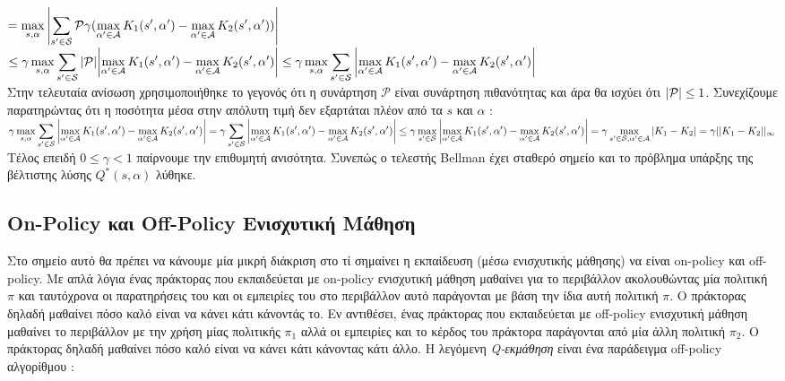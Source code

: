 \documentclass[11pt]{article} %
\numberwithin{equation}{subsection}
\begin{document}
$\displaystyle= \max_{s, \alpha} \abs{ \sum_{s' \in \mathcal{S}} \mathcal{P} \gamma (\max_{\alpha ' \in \mathcal{A}} K_1 (s', \alpha ') -\max_{\alpha ' \in \mathcal{A}} K_2 (s', \alpha ')) }$\\

$\displaystyle \leq \gamma \max_{s, \alpha}  \sum_{s' \in \mathcal{S}} \abs{ \mathcal{P}} \abs{\max_{\alpha ' \in \mathcal{A}} K_1 (s', \alpha ') -\max_{\alpha ' \in \mathcal{A}} K_2 (s', \alpha ')} \leq \gamma  \max_{s, \alpha}  \sum_{s' \in \mathcal{S}}\abs{\max_{\alpha ' \in \mathcal{A}} K_1 (s', \alpha ') -\max_{\alpha ' \in \mathcal{A}} K_2 (s', \alpha ')}  $\\

Στην τελευταία ανίσωση χρησιμοποιήθηκε το γεγονός ότι η συνάρτηση $\mathcal{P}$ είναι συνάρτηση πιθανότητας και άρα θα ισχύει ότι $\abs{\mathcal{P}} \leq 1$. Συνεχίζουμε παρατηρώντας ότι η ποσότητα μέσα στην απόλυτη τιμή δεν εξαρτάται πλέον από τα $s$ και $\alpha$ :\\

$\displaystyle \gamma  \max_{s, \alpha}  \sum_{s' \in \mathcal{S}}\abs{\max_{\alpha ' \in \mathcal{A}} K_1 (s', \alpha ') -\max_{\alpha ' \in \mathcal{A}} K_2 (s', \alpha ')} = \gamma \sum_{s' \in \mathcal{S}}\abs{\max_{\alpha ' \in \mathcal{A}} K_1 (s', \alpha ') -\max_{\alpha ' \in \mathcal{A}} K_2 (s', \alpha ')} \leq \gamma \max_{s' \in \mathcal{S}} \abs{\max_{\alpha ' \in \mathcal{A}} K_1 (s', \alpha ') -\max_{\alpha ' \in \mathcal{A}} K_2 (s', \alpha ')} = \gamma \max_{s' \in \mathcal{S}, \alpha ' \in \mathcal{A}} \abs{K_1 - K_2} = \gamma ||K_1 - K_2||_{\infty}$\\

Τέλος επειδή $0 \leq \gamma < 1$ παίρνουμε την επιθυμητή ανισότητα. Συνεπώς ο τελεστής Bellman έχει σταθερό σημείο και το πρόβλημα υπάρξης της βέλτιστης λύσης $Q^*(s,\alpha)$ λύθηκε. \\



\subsection{On-Policy και Off-Policy Ενισχυτική Μάθηση}

 Στο σημείο αυτό θα πρέπει να κάνουμε μία μικρή διάκριση στο τί σημαίνει η εκπαίδευση (μέσω ενισχυτικής μάθησης) να είναι on-policy και off-policy. Με απλά λόγια ένας πράκτορας που εκπαιδεύεται με on-policy ενισχυτική μάθηση μαθαίνει για το περιβάλλον ακολουθώντας μία πολιτική $\pi$ και ταυτόχρονα οι παρατηρήσεις του και οι εμπειρίες του στο περιβάλλον αυτό παράγονται με βάση την ίδια αυτή πολιτική $\pi$. Ο πράκτορας δηλαδή μαθαίνει πόσο καλό είναι να κάνει κάτι κάνοντάς το. Εν αντιθέσει, ένας πράκτορας που εκπαιδεύεται με off-policy ενισχυτική μάθηση μαθαίνει το περιβάλλον με την χρήση μίας πολιτικής $\pi_{1}$ αλλά οι εμπειρίες και το κέρδος του πράκτορα παράγονται από μία άλλη πολιτική $\pi_{2}$. Ο πράκτορας δηλαδή μαθαίνει πόσο καλό είναι να κάνει κάτι κάνοντας κάτι άλλο. Η λεγόμενη \textit{Q-εκμάθηση} είναι ένα παράδειγμα off-policy αλγορίθμου \cite{sutton}:\\
\end{document}
